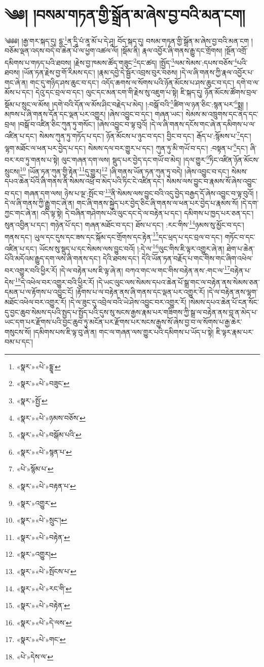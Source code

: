 \chapter{༄༅། །བསམ་གཏན་གྱི་སྒྲོན་མ་ཞེས་བྱ་བའི་མན་ངག།}༄༅༅། །རྒྱ་གར་སྐད་དུ། དྷྱ་\footnote{«སྣར་»«པེ་»དྷྱཱ་}ན་དཱི་པཾ་ནཱ་མོ་པ་དེ་ཤཱ། བོད་སྐད་དུ། བསམ་གཏན་གྱི་སྒྲོན་མ་ཞེས་བྱ་བའི་མན་ངག །བཅོམ་ལྡན་འདས་བདེ་བ་ཆེན་པོ་ལ་ཕྱག་འཚལ་ལོ། །སྡོམ་ནི། རྣལ་འབྱོར་ཞི་གནས་རྒྱུ་དང་གྲོགས། །སྔོན་འགྲོ་དམིགས་པ་གཏད་པའི་ཐབས། །རྗེས་བྱ་ཁམས་ཚོད་གཟུང་\footnote{«སྣར་»«པེ་»བཟུང་}དང་ཚད། །སྤྱོད་\footnote{«སྣར་»སྤྱོ་}ལམ་སེམས་:དཔས་བཅོས་\footnote{«སྣར་»«པེ་»ཉམས་བཅོས་}པའི་ཐབས། །ཡོན་ཏན་རྗེས་བྱ་གོ་རིམས་དང་། །རྣམ་དབྱེ་དེ་སྦྱོར་འབྲས་བུར་བཅས། །དེ་ལ་ཞི་གནས་ཀྱི་རྣལ་འབྱོར་པ་གང་ཞེ་ན། གང་དུ་གཉིད་ཤས་ཆུང་བ་དང་། འདོད་ཆགས་ལ་སོགས་པའི་ཉོན་མོངས་པ་ཤས་ཆུང་བ་དང་། དགེ་བ་ལ་མོས་པ་དང་། དེའུ་དང་བྲལ་བ་དང་། ལུང་དང་མན་ངག་གི་རྗེས་སུ་འཇུག་པ་སྟེ། ཇི་སྐད་དུ། ཉོན་མོངས་ཚོགས་བྲལ་སྡོམ་པ་སྲུང་ལ་མོས། །དགེ་བའི་དོན་ལ་མོས་ཤིང་བརྗེད་པ་མེད། །:བསྒོ་བའི་\footnote{«སྣར་»«པེ་»བསྒོམ་པའི་}ཚིག་ལ་ཉན་ཅིང་:སྙན་པར་\footnote{«སྣར་»«པེ་»སྙན་པ་}སྨྲ། །མཁས་པ་ཞི་གནས་དོན་དང་ལྡན་པར་འགྱུར། །ཞེས་འབྱུང་བ་དང་། གཞན་ཡང་། སེམས་མ་འཁྲུགས་དང་ནད་དང་བྲལ། །བསྒོ་བ་འཛིན་ཅིང་ཀུན་ཏུ་གསོང་། །ཞེས་འབྱུང་བ་ལྟ་བུའོ། །དེ་ལ་ཞི་གནས་དངོས་གང་ཞེ་ན་དམིགས་པ་ལ་འཛིན་པ་དང་། སེམས་ཀུན་ཏུ་གཏོད་པ་དང་། ཉོན་མོངས་པ་ཉུང་བ་དང་། བྱིང་བ་དང་། རྒོད་པ་:སྙོམས་པ་\footnote{«པེ་»སྙོམ་པ་}དང་། ལྷག་མཐོང་ལ་ཕན་པར་བྱེད་པ་དང་། སེམས་དལ་བར་གྱུར་པ་དང་། ཀུན་ཏུ་མི་གཡོ་བ་དང་། :བསྟན་པ་\footnote{«སྣར་»«པེ་»བརྟན་པ་}དང་། ཞི་བར་རབ་ཏུ་གནས་པ་སྟེ། ལུང་གཞན་དག་ལས། སྡུད་པར་བྱེད་དང་གཡོ་བ་མེད། །དལ་གྱུར་\footnote{«སྣར་»འགྱུར་}ཏིང་འཛིན་ཉོན་མོངས་སྲུངས།\footnote{«སྣར་»«པེ་»སྲུང་།} །ཡོན་ཏན་ཀུན་གྱི་རྟེན་\footnote{«སྣར་»«པེ་»བརྟེན་}དུ་གྱུར།\footnote{«སྣར་»འགྱུར།} །ཞི་གནས་ཡོན་ཏན་ཀུན་ཏུ་བདེ། །ཞེས་འབྱུང་བ་དང་། སེམས་དཔའ་ཆེན་པོའི་ཞི་གནས་ནི་སེམས་འཕྲོ་བ་མེད་པའི་ཏིང་ངེ་འཛིན་དང་། སེམས་ལས་བྱུང་བ་རྣམས་སོ་ཞེས་འབྱུང་བ་དང་། གཞན་དག་ལས། ཉེས་པ་ལྔ་:སྤོང་བ་\footnote{«སྣར་»«པེ་»སྤོངས་པ་}ནི་སེམས་ལས་བྱུང་བའི་འདུ་བྱེད་བརྒྱད་དོ་ཞེས་འབྱུང་བ་ལྟ་བུའོ། །དེ་ལ་ཞི་གནས་ཀྱི་རྒྱུ་གང་ཞེ་ན། གང་ཞི་གནས་སྐྱེད་པར་བྱེད་ཅིང་ཞི་གནས་ལ་ཕན་པར་བྱེད་པ་རྣམས་སོ། །དེ་དག་ཀྱང་གང་ཞེ་ན། འདི་ལྟ་སྟེ། དེ་བཞིན་གཤེགས་པའི་ལུང་དང་དེ་ལ་བརྟེན་པ་དང་། དམིགས་པ་ཁྱད་པར་ཅན་དང་། སུན་འབྱིན་པ་དང་། གཉེན་པོ་དང་། གཞན་མཐོང་བ་དང་། ཐོས་པ་དང་། :རང་གིས་\footnote{«སྣར་»«པེ་»རང་གི་}ཉམས་སུ་མྱོང་བ་དང་། གནས་དང་། ཡུལ་དང་དུས་དང་ཟས་དང་སྐོམ་དང་གྲོགས་དང་རྟེན་\footnote{«སྣར་»«པེ་»བརྟེན་}དང་ཕྲད་པ་དང་བྲལ་བ་དང་། གཏོང་བ་དང་འཛིན་པ་དང་། ཡོངས་སུ་སྡུད་པ་དང་སེམས་ལས་བྱུང་བའོ། །:དེ་ལ་\footnote{«སྣར་»«པེ་»དེ་ལས་}ལུང་གིས་ཇི་ལྟར་འགྱུར་ཞེ་ན། ཐེག་པ་ཆེན་པོའི་མདོའམ་རྒྱུད་དག་ལས་ཞི་གནས་དང་། དེའི་ཐབས་དང་། དེའི་ཡོན་ཏན་བརྗོད་པ་གང་གིས་གང་ཞིག་འཕེལ་བར་འགྱུར་བའི་ཕྱིར་རོ། །དེ་ལ་བརྟེན་པས་ཇི་ལྟ་ཞེ་ན། བཀའ་གང་ལ་གང་གིས་བརྟེན་ནས་:གང་ལ་\footnote{«སྣར་»«པེ་»གང་}བརྟེན་པ་དེས་\footnote{«པེ་»དེས་ལ་}དེ་འཕེལ་བར་འགྱུར་བའི་ཕྱིར་རོ། །དེ་ཡང་ལུང་ལས་སེམས་དཔའ་ཆེན་པོ་སྒྲ་གང་ལ་བརྟེན་ནས་སེམས་ཅན་དམན་པ་ལ་རྟོགས་པ་འབྱུང་ངོ། །རྟོགས་པ་ལ་བརྟེན་ནས་ཞི་གནས་དང་ལྡན་པར་འགྱུར་རོ། །དེ་ལ་བརྟེན་ནས་ལྷག་མཐོང་འཕེལ་བར་འགྱུར་རོ། །དེ་ལ་ཟུང་དུ་འབྲེལ་བའི་ཡེ་ཤེས་འབྱུང་བར་འགྱུར་རོ། །སེམས་དཔའ་ཆེན་པོ་ངན་སོང་དུ་བྱང་ཆུབ་སེམས་དཔའི་སྤྱད་པ་སྤྱོད་པའི་དུས་སུ་སངས་རྒྱས་རྣམ་པར་གཟིགས་ཀྱི་སྒྲ་ལ་བརྟེན་ནས་བླ་ན་མེད་པ་ཡང་དག་པར་རྫོགས་པའི་བྱང་ཆུབ་ཏུ་མངོན་པར་རྫོགས་པར་སངས་རྒྱས་སོ་ཞེས་བྱ་བ་ལ་སོགས་པ་རྒྱ་ཆེར་གསུངས་སོ། །དམིགས་པས་ཇི་ལྟ་བུ་ཞེ་ན། གང་ལ་གཞན་ལས་གྱུར་པའི་དམིགས་པ་ཡོད་པ་སྟེ། ཇི་ལྟར་རྣམ་པར་བམ་པ་དང་། 